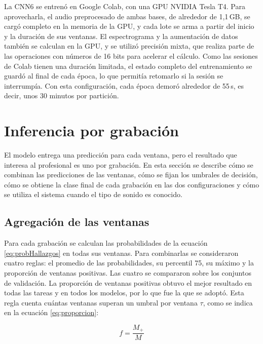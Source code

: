La CNN6 se entrenó en Google Colab, con una GPU NVIDIA Tesla T4. Para aprovecharla, el audio
preprocesado de ambas bases, de alrededor de 1,1\,GB, se cargó completo en la memoria de la GPU,
y cada lote se arma a partir del inicio y la duración de sus ventanas. El espectrograma y la
aumentación de datos también se calculan en la GPU, y se utilizó precisión mixta, que realiza
parte de las operaciones con números de 16 bits para acelerar el cálculo. Como las sesiones de
Colab tienen una duración limitada, el estado completo del entrenamiento se guardó al final de cada
época, lo que permitía retomarlo si la sesión se interrumpía. Con esta configuración, cada época
demoró alrededor de 55\,s, es decir, unos 30 minutos por partición.


\section{Inferencia por grabación}
\label{sec:inferencia}

El modelo entrega una predicción para cada ventana, pero el resultado que interesa al profesional
es uno por grabación. En esta sección se describe cómo se combinan las predicciones de las
ventanas, cómo se fijan los umbrales de decisión, cómo se obtiene la clase final de cada grabación
en las dos configuraciones y cómo se utiliza el sistema cuando el tipo de sonido es conocido.

\subsection{Agregación de las ventanas}
\label{subsec:agregacion}

Para cada grabación se calculan las probabilidades de la ecuación \ref{eq:probHallazgos} en todas
sus ventanas. Para combinarlas se consideraron cuatro reglas: el promedio de las probabilidades, su
percentil 75, su máximo y la proporción de ventanas positivas. Las cuatro se compararon sobre los
conjuntos de validación. La proporción de ventanas positivas obtuvo el mejor resultado en todas
las tareas y en todos los modelos, por lo que fue la que se adoptó. Esta regla cuenta cuántas
ventanas superan un umbral por ventana $\tau$, como se indica en la ecuación \ref{eq:proporcion}:

\begin{equation}
	\label{eq:proporcion}
	f = \frac{M_{+}}{M}
\end{equation}

